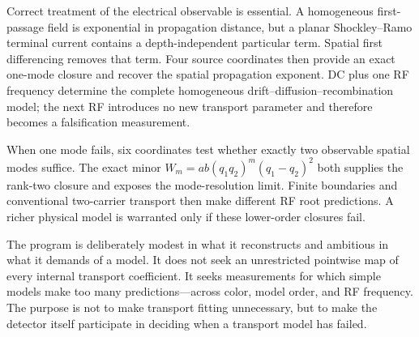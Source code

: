 \documentclass[11pt]{article}
\begin{document}
Correct treatment of the electrical observable is essential. A homogeneous first-passage field is exponential in propagation distance, but a planar Shockley--Ramo terminal current contains a depth-independent particular term. Spatial first differencing removes that term. Four source coordinates then provide an exact one-mode closure and recover the spatial propagation exponent. DC plus one RF frequency determine the complete homogeneous drift--diffusion--recombination model; the next RF introduces no new transport parameter and therefore becomes a falsification measurement.

When one mode fails, six coordinates test whether exactly two observable spatial modes suffice. The exact minor $W_m=ab(q_1q_2)^m(q_1-q_2)^2$ both supplies the rank-two closure and exposes the mode-resolution limit. Finite boundaries and conventional two-carrier transport then make different RF root predictions. A richer physical model is warranted only if these lower-order closures fail.

The program is deliberately modest in what it reconstructs and ambitious in what it demands of a model. It does not seek an unrestricted pointwise map of every internal transport coefficient. It seeks measurements for which simple models make too many predictions---across color, model order, and RF frequency. The purpose is not to make transport fitting unnecessary, but to make the detector itself participate in deciding when a transport model has failed.



\end{document}
